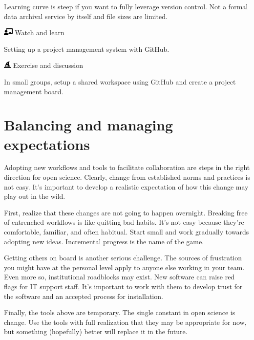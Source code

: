 \documentclass[
  letterpaper,
  DIV=11,
  numbers=noendperiod]{scrreprt}
\begin{document}
Learning curve is steep if you want to fully leverage version control.
Not a formal data archival service by itself and file sizes are limited.

\includegraphics[width=1.25em,height=1em]{./collaborate_files/figure-pdf/fa-icon-5a0e5cd7bfbf585f8546c1ff4cebae73.pdf}
Watch and learn

Setting up a project management system with GitHub.

\includegraphics[width=1em,height=1em]{./collaborate_files/figure-pdf/fa-icon-20d474448f872ee43905e611a2502347.pdf}
Exercise and discussion

In small groups, setup a shared workspace using GitHub and create a
project management board.

\hypertarget{balancing-and-managing-expectations}{%
\section{Balancing and managing
expectations}\label{balancing-and-managing-expectations}}

Adopting new workflows and tools to facilitate collaboration are steps
in the right direction for open science. Clearly, change from
established norms and practices is not easy. It's important to develop a
realistic expectation of how this change may play out in the wild.

First, realize that these changes are not going to happen overnight.
Breaking free of entrenched workflows is like quitting bad habits. It's
not easy because they're comfortable, familiar, and often habitual.
Start small and work gradually towards adopting new ideas. Incremental
progress is the name of the game.

Getting others on board is another serious challenge. The sources of
frustration you might have at the personal level apply to anyone else
working in your team. Even more so, institutional roadblocks may exist.
New software can raise red flags for IT support staff. It's important to
work with them to develop trust for the software and an accepted process
for installation.

Finally, the tools above are temporary. The single constant in open
science is change. Use the tools with full realization that they may be
appropriate for now, but something (hopefully) better will replace it in
the future.
\end{document}
